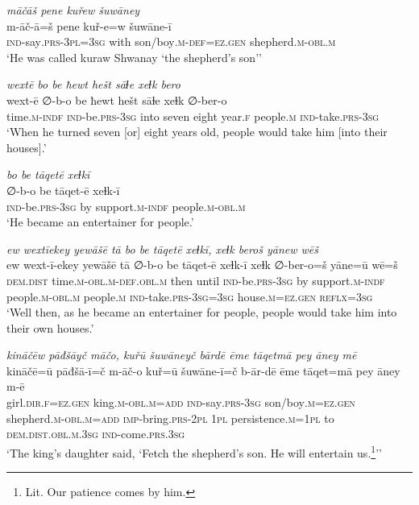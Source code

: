 \ea \label{KŠ.33}
\textit{māčāš pene kuřew šuwāney} \\ 
\gll m-āč-ā=š pene kuř-e=w šuwāne-ī \\ 
 \textsc{ind-}say\textsc{.prs}\textsc{-3pl}\textsc{=3sg} with son/boy\textsc{.m}\textsc{-def}\textsc{=ez.gen} shepherd\textsc{.m}\textsc{-obl}\textsc{.m} \\ 
\glt `He was called kuraw Shwanay ‘the shepherd’s son’'
\z 
 
\ea \label{KŠ.36}
\textit{wextē bo be ħewt hešt sāɫe xeɫk bero} \\ 
\gll wext-ē ∅-b-o be ħewt hešt sāɫe xeɫk ∅-ber-o \\ 
 time\textsc{.m}\textsc{-indf} \textsc{ind-}be\textsc{.prs}\textsc{-3sg} into seven eight year\textsc{.f} people\textsc{.m} \textsc{ind-}take\textsc{.prs}\textsc{-3sg} \\ 
\glt `When he turned seven [or] eight years old, people would take him [into their houses].'
\z 
 
\ea \label{KŠ.37}
\textit{bo be tāqetē xeɫkī} \\ 
\gll ∅-b-o be tāqet-ē xeɫk-ī \\ 
 \textsc{ind-}be\textsc{.prs}\textsc{-3sg} by support\textsc{.m}\textsc{-indf} people\textsc{.m}\textsc{-obl}\textsc{.m} \\ 
\glt `He became an entertainer for people.'
\z 
 
\ea \label{KŠ.38}
\textit{ew wextīekey yewāšē tā bo be tāqetē xeɫkī, xeɫk beroš yānew wēš} \\ 
\gll ew wext-ī-ekey yewāšē tā ∅-b-o be tāqet-ē xeɫk-ī xeɫk ∅-ber-o=š yāne=ū wē=š \\ 
 \textsc{dem.dist} time\textsc{.m}\textsc{-obl}\textsc{.m}\textsc{-def}\textsc{.obl}\textsc{.m} then until \textsc{ind-}be\textsc{.prs}\textsc{-3sg} by support\textsc{.m}\textsc{-indf} people\textsc{.m}\textsc{-obl}\textsc{.m} people\textsc{.m} \textsc{ind-}take\textsc{.prs}\textsc{-3sg}\textsc{=3sg} house\textsc{.m}\textsc{=ez.gen} \textsc{reflx}\textsc{=3sg} \\ 
\glt `Well then, as he became an entertainer for people, people would take him into their own houses.'
\z 
 
\ea \label{KŠ.40}
\textit{kināčēw pāđšāyč māčo, kuřū šuwāneyč bārdē ēme tāqetmā pey āney mē} \\ 
\gll kināčē=ū pāđšā-ī=č m-āč-o kuř=ū šuwāne-ī=č b-ār-dē ēme tāqet=mā pey āney m-ē \\ 
 girl\textsc{.dir}\textsc{.f}\textsc{=ez.gen} king\textsc{.m}\textsc{-obl}\textsc{.m}\textsc{=add} \textsc{ind-}say\textsc{.prs}\textsc{-3sg} son/boy\textsc{.m}\textsc{=ez.gen} shepherd\textsc{.m}\textsc{-obl}\textsc{.m}\textsc{=add} \textsc{imp-}bring\textsc{.prs}-\textsc{2pl} \textsc{1pl} persistence\textsc{.m}\textsc{=\textsc{1pl}} to \textsc{dem.dist}\textsc{.obl}\textsc{.m}\textsc{.3sg} \textsc{ind-}come\textsc{.prs}\textsc{.3sg} \\ 
\glt `The king’s daughter said, ‘Fetch the shepherd’s son. He will entertain us.\footnote{Lit. Our patience comes by him.}’'
\z 
 
